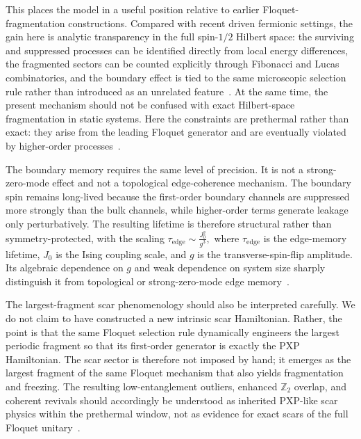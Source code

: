 \documentclass[aps,prb,reprint,twocolumn,amsmath,amssymb,citeautoscript]{revtex4-2}
\begin{document}
This places the model in a useful position relative to earlier Floquet-fragmentation constructions. Compared with recent driven fermionic settings, the gain here is analytic transparency in the full spin-$1/2$ Hilbert space: the surviving and suppressed processes can be identified directly from local energy differences, the fragmented sectors can be counted explicitly through Fibonacci and Lucas combinatorics, and the boundary effect is tied to the same microscopic selection rule rather than introduced as an unrelated feature~\cite{Ghosh2023PRL,Ghosh2024PRB,GhoshPaulSengupta2025Spin}. At the same time, the present mechanism should not be confused with exact Hilbert-space fragmentation in static systems. Here the constraints are prethermal rather than exact: they arise from the leading Floquet generator and are eventually violated by higher-order processes~\cite{Sala2020PRX,Khemani2020PRBShattering}.

The boundary memory requires the same level of precision. It is not a strong-zero-mode effect and not a topological edge-coherence mechanism. The boundary spin remains long-lived because the first-order boundary channels are suppressed more strongly than the bulk channels, while higher-order terms generate leakage only perturbatively. The resulting lifetime is therefore structural rather than symmetry-protected, with the scaling $\tau_{\mathrm{edge}} \sim \frac{J_0^2}{g^3},$ where $\tau_{\mathrm{edge}}$ is the edge-memory lifetime, $J_0$ is the Ising coupling scale, and $g$ is the transverse-spin-flip amplitude. Its algebraic dependence on $g$ and weak dependence on system size sharply distinguish it from topological or strong-zero-mode edge memory~\cite{ElseFendleyKempNayak2017PRX,KempYaoLaumann2020PRL,Mukherjee2024PRBEdgeMemory}.

The largest-fragment scar phenomenology should also be interpreted carefully. We do not claim to have constructed a new intrinsic scar Hamiltonian. Rather, the point is that the same Floquet selection rule dynamically engineers the largest periodic fragment so that its first-order generator is exactly the PXP Hamiltonian. The scar sector is therefore not imposed by hand; it emerges as the largest fragment of the same Floquet mechanism that also yields fragmentation and freezing. The resulting low-entanglement outliers, enhanced $\mathbb{Z}_2$ overlap, and coherent revivals should accordingly be understood as inherited PXP-like scar physics within the prethermal window, not as evidence for exact scars of the full Floquet unitary~\cite{Turner2018NatPhys,Mukherjee2020PRBFloquetScars,Ghosh2026arXiv}.
\end{document}
